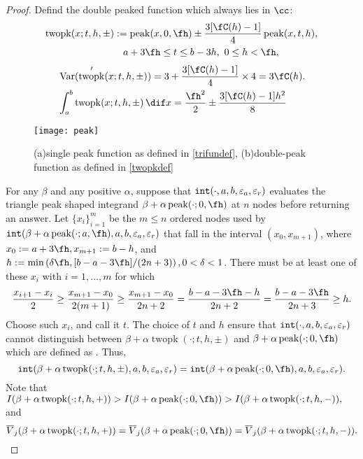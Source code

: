 \documentclass{iitthesis}
\DeclareMathOperator{\goodinteg}{\texttt{\textup{int}}}
\DeclareMathOperator{\Var}{Var}
\newcommand{\oV}{\overline{V}}
\DeclareMathOperator{\tri}{peak}
\DeclareMathOperator{\twopk}{twopk}
\newcommand{\hcut}{\fh}
\begin{document}
\begin{proof}
Defind the double peaked function which always lies in $\cc$:
\begin{multline}\label{twopkdef}
\twopk(x;t,h,\pm):= \tri(x,0,\hcut) \pm \frac{3[\fC(h)-1]}{4}\tri(x,t,h), \\
 \qquad \qquad a+3\hcut \le t \le b-3h, \ 0\le h < \hcut,
\end{multline}
\begin{align}\label{value}
&\Var(\twopk'(x;t,h,\pm)) = 3 +  \frac{3[\fC(h)-1]}{4} \times 4 = 3 \fC(h).\\
&\int_a^b \twopk(x;t,h,\pm)  \, \dif x = \frac{\hcut^2}{2} \pm \frac{3[\fC(h)-1]h^2}{8}
\end{align}


\begin{figure}
 \centering
 \texttt{[image: peak]}
 \caption{(a)single peak function as defined in \eqref{trifundef}, (b)double-peak function as defined in \eqref{twopkdef}}   
\end{figure}

For any $\beta$ and any positive $\alpha$, suppose that $\goodinteg(\cdot,a,b,\varepsilon_{a},\varepsilon_{r})$ 
evaluates the triangle peak shaped integrand $\beta+\alpha \tri(\cdot;0,\hcut)$ at $n$ nodes before returning an answer. Let $\{x_{i}\}_{i=1}^{m}$ be the $m\le n$ ordered nodes used by $\goodinteg(\beta+\alpha \tri(\cdot;a,\hcut),a,b,\varepsilon_{a},\varepsilon_{r})$ that fall in the interval $(x_{0},x_{m+1})$, where $x_{0}:=a+3\hcut, x_{m+1}:=b-h$, and $ h:=\min\left(\delta\hcut,[b-a-3\hcut]/(2n+3)\right),0<\delta<1$. There must be at least one  of these $x_{i}$ with $i=1,...,m$ for which
$$\frac{x_{i+1}-x_{i}}{2} \ge \frac{x_{m+1}-x_{0}}{2(m+1)} \ge \frac{x_{m+1}-x_{0}}{2n+2}=\frac{b-a-3\hcut-h}{2n+2}=\frac{b-a-3\hcut}{2n+3}\ge h.$$
Choose such $x_{i}$, and call it $t$. The choice of $t$ and $h$ ensure that $\goodinteg(\cdot,a,b,\varepsilon_{a},\varepsilon_{r})$ cannot distinguish between $\beta+\alpha \twopk(\cdot;t,h,\pm)$ and $\beta+\alpha \tri(\cdot;0,\hcut)$ which are defined as . Thus,
$$\goodinteg(\beta+\alpha \twopk(\cdot;t,h,\pm),a,b,\varepsilon_{a},\varepsilon_{r})= \goodinteg(\beta+\alpha \tri(\cdot;0,\hcut),a,b,\varepsilon_{a},\varepsilon_{r}).$$
Note that \\ 
$I(\beta+\alpha \twopk(\cdot;t,h,+))>I(\beta+\alpha \tri(\cdot;0,\hcut))>I(\beta+\alpha \twopk(\cdot;t,h,-)),$\\ 
and
$$\displaystyle\oV_{j}(\beta+\alpha \twopk(\cdot;t,h,+))=\displaystyle\oV_{j}(\beta+\alpha \tri(\cdot;0,\hcut))=\displaystyle\oV_{j}(\beta+\alpha \twopk(\cdot;t,h,-)).$$


\end{proof}
\end{document}

